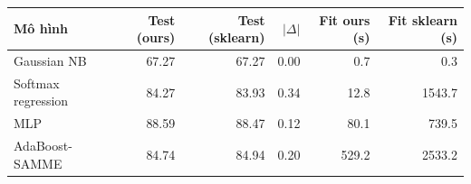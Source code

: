 \begin{tabular}{lrrrrr}
\toprule
Mô hình & Test (ours) & Test (sklearn) & $|\Delta|$ & Fit ours (s) & Fit sklearn (s) \\
\midrule
Gaussian NB & 67.27 & 67.27 & 0.00 & 0.7 & 0.3 \\
Softmax regression & 84.27 & 83.93 & 0.34 & 12.8 & 1543.7 \\
MLP & 88.59 & 88.47 & 0.12 & 80.1 & 739.5 \\
AdaBoost-SAMME & 84.74 & 84.94 & 0.20 & 529.2 & 2533.2 \\
\bottomrule
\end{tabular}
